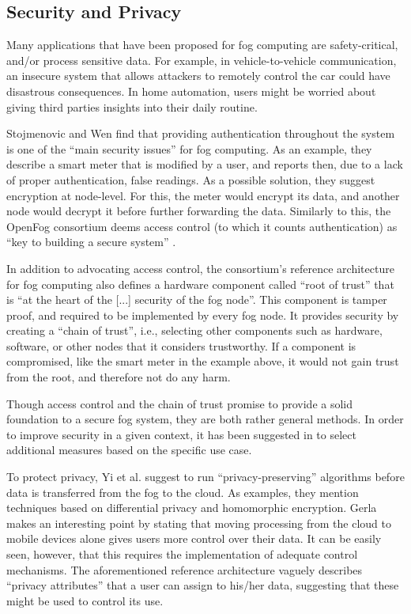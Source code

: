 \documentclass{article}
\begin{document}

\subsection{Security and Privacy}
Many applications that have been proposed for fog computing are safety-critical, and/or process sensitive data. For example, in vehicle-to-vehicle communication, an insecure system that allows attackers to remotely control the car could have disastrous consequences. In home automation, users might be worried about giving third parties insights into their daily routine.

Stojmenovic and Wen \cite{stojmenovic2014fog} find that providing authentication throughout the system is one of the ``main security issues'' for fog computing. As an example, they describe a smart meter that is modified by a user, and reports then, due to a lack of proper authentication, false readings. As a possible solution, they suggest encryption at node-level. For this, the meter would encrypt its data, and another node would decrypt it before further forwarding the data. Similarly to this, the OpenFog consortium deems access control (to which it counts authentication) as ``key to building a secure system'' \cite{openfogconsortium2017}. 

In addition to advocating access control, the consortium's reference architecture for fog computing also defines a hardware component called ``root of trust'' that is ``at the heart of the [...] security of the fog node''. This component is tamper proof, and required to be implemented by every fog node. It provides security by creating a ``chain of trust'', i.e., selecting other components such as hardware, software, or other nodes that it considers trustworthy. If a component is compromised, like the smart meter in the example above, it would not gain trust from the root, and therefore not do any harm.

Though access control and the chain of trust promise to provide a solid foundation to a secure fog system, they are both rather general methods. In order to improve security in a given context, it has been suggested in \cite{openfogconsortium2017} to select additional measures based on the specific use case.

To protect privacy, Yi et al. \cite{yi2015survey} suggest to run ``privacy-preserving'' algorithms before data is transferred from the fog to the cloud. As examples, they mention techniques based on differential privacy and homomorphic encryption. Gerla \cite{gerla2012vehicular} makes an interesting point by stating that moving processing from the cloud to mobile devices alone gives users more control over their data. It can be easily seen, however, that this requires the implementation of adequate control mechanisms. The aforementioned reference architecture \cite{openfogconsortium2017} vaguely describes ``privacy attributes'' that a user can assign to his/her data, suggesting that these might be used to control its use.
\end{document}
